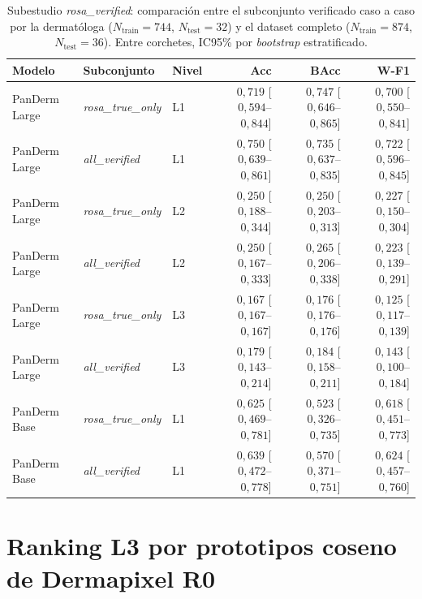 \begin{table}[H]
\centering
\footnotesize
\setlength{\tabcolsep}{4pt}
\renewcommand{\arraystretch}{0.95}
\caption{Subestudio \emph{rosa\_verified}: comparación entre el
subconjunto verificado caso a caso por la dermatóloga
($N_{\mathrm{train}} = 744$, $N_{\mathrm{test}} = 32$) y el dataset
completo ($N_{\mathrm{train}} = 874$, $N_{\mathrm{test}} = 36$).
Entre corchetes, IC95\% por \emph{bootstrap} estratificado.}
\label{tab:dermapixel-rosa}
\begin{tabular}{lllrrr}
\hline
Modelo & Subconjunto & Nivel & Acc & BAcc & W-F1 \\
\hline
PanDerm Large & \emph{rosa\_true\_only} & L1
  & $0{,}719$ [$0{,}594$--$0{,}844$]
  & $0{,}747$ [$0{,}646$--$0{,}865$]
  & $0{,}700$ [$0{,}550$--$0{,}841$] \\
PanDerm Large & \emph{all\_verified}    & L1
  & $0{,}750$ [$0{,}639$--$0{,}861$]
  & $0{,}735$ [$0{,}637$--$0{,}835$]
  & $0{,}722$ [$0{,}596$--$0{,}845$] \\
PanDerm Large & \emph{rosa\_true\_only} & L2
  & $0{,}250$ [$0{,}188$--$0{,}344$]
  & $0{,}250$ [$0{,}203$--$0{,}313$]
  & $0{,}227$ [$0{,}150$--$0{,}304$] \\
PanDerm Large & \emph{all\_verified}    & L2
  & $0{,}250$ [$0{,}167$--$0{,}333$]
  & $0{,}265$ [$0{,}206$--$0{,}338$]
  & $0{,}223$ [$0{,}139$--$0{,}291$] \\
PanDerm Large & \emph{rosa\_true\_only} & L3
  & $0{,}167$ [$0{,}167$--$0{,}167$]
  & $0{,}176$ [$0{,}176$--$0{,}176$]
  & $0{,}125$ [$0{,}117$--$0{,}139$] \\
PanDerm Large & \emph{all\_verified}    & L3
  & $0{,}179$ [$0{,}143$--$0{,}214$]
  & $0{,}184$ [$0{,}158$--$0{,}211$]
  & $0{,}143$ [$0{,}100$--$0{,}184$] \\
PanDerm Base  & \emph{rosa\_true\_only} & L1
  & $0{,}625$ [$0{,}469$--$0{,}781$]
  & $0{,}523$ [$0{,}326$--$0{,}735$]
  & $0{,}618$ [$0{,}451$--$0{,}773$] \\
PanDerm Base  & \emph{all\_verified}    & L1
  & $0{,}639$ [$0{,}472$--$0{,}778$]
  & $0{,}570$ [$0{,}371$--$0{,}751$]
  & $0{,}624$ [$0{,}457$--$0{,}760$] \\
\hline
\end{tabular}
\end{table}


\section{Ranking L3 por prototipos coseno de Dermapixel R0}
\label{sec:anexoj-l3-prototipos}

